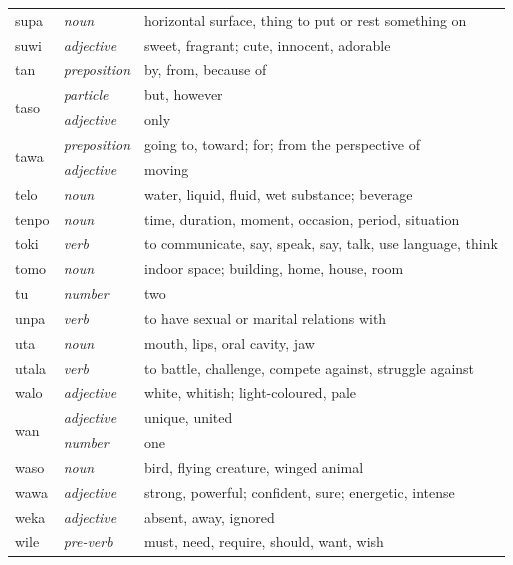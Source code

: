 \documentclass[14pt, a4paper]{extreport}
\begin{document}
\begin{longtable}{llp{10cm}}
  supa & \textit{noun} & horizontal surface, thing to put or rest something on \\
  suwi & \textit{adjective} & sweet, fragrant; cute, innocent, adorable \\
  tan & \textit{preposition} & by, from, because of \\
  \multirow[t]{2}{*}{taso} & \textit{particle} & but, however \\
  & \textit{adjective} & only \\
  \multirow[t]{2}{*}{tawa} & \textit{preposition} & going to, toward; for; from the perspective of \\
  & \textit{adjective} & moving \\
  telo & \textit{noun} & water, liquid, fluid, wet substance; beverage \\
  tenpo & \textit{noun} & time, duration, moment, occasion, period, situation \\
  toki & \textit{verb} & to communicate, say, speak, say, talk, use language, think \\
  tomo & \textit{noun} & indoor space; building, home, house, room \\
  tu & \textit{number} & two \\
  unpa & \textit{verb} & to have sexual or marital relations with \\
  uta & \textit{noun} & mouth, lips, oral cavity, jaw \\
  utala & \textit{verb} & to battle, challenge, compete against, struggle against \\
  walo & \textit{adjective} & white, whitish; light-coloured, pale \\
  \multirow[t]{2}{*}{wan} & \textit{adjective} & unique, united \\
  & \textit{number} & one \\
  waso & \textit{noun} & bird, flying creature, winged animal \\
  wawa & \textit{adjective} & strong, powerful; confident, sure; energetic, intense \\
  weka & \textit{adjective} & absent, away, ignored \\
  wile & \textit{pre-verb} & must, need, require, should, want, wish \\
\end{longtable}
\end{document}
